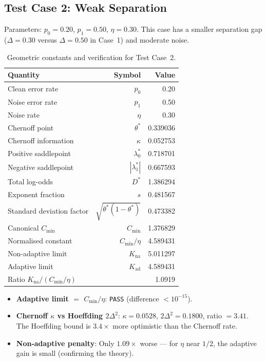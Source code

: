 \documentclass[article]{amsart}
\theoremstyle{definition}
\begin{document}
\subsection{Test Case 2: Weak Separation}

Parameters: $p_0 = 0.20$, $p_1 = 0.50$, $\eta = 0.30$. This case has a smaller separation gap ($\Delta = 0.30$ versus $\Delta = 0.50$ in Case~1) and moderate noise.

\begin{table}[htbp]
\centering
\caption{Geometric constants and verification for Test Case~2.}
\label{tab:case2}
\begin{tabular}{lrr}
\toprule
Quantity & Symbol & Value \\
\midrule
Clean error rate & $p_0$ & 0.20 \\
Noise error rate & $p_1$ & 0.50 \\
Noise rate & $\eta$ & 0.30 \\
Chernoff point & $\theta^*$ & 0.339036 \\
Chernoff information & $\kappa$ & 0.052753 \\
Positive saddlepoint & $\lambda_0^*$ & 0.718701 \\
Negative saddlepoint & $|\lambda_1^*|$ & 0.667593 \\
Total log-odds & $D^*$ & 1.386294 \\
Exponent fraction & $s$ & 0.481567 \\
Standard deviation factor & $\sqrt{\theta^*(1-\theta^*)}$ & 0.473382 \\
\midrule
Canonical $C_{\min}$ & $C_{\min}$ & 1.376829 \\
Normalised constant & $C_{\min}/\eta$ & 4.589431 \\
Non-adaptive limit & $K_{\mathrm{na}}$ & 5.011297 \\
Adaptive limit & $K_{\mathrm{ad}}$ & 4.589431 \\
Ratio $K_{\mathrm{na}} / (C_{\min}/\eta)$ & & 1.0919 \\
\bottomrule
\end{tabular}
\end{table}

\begin{itemize}
    \item\textbf{Adaptive limit $=$ $C_{\min}/\eta$}: \texttt{PASS} (difference $< 10^{-15}$).
    \item\textbf{Chernoff $\kappa$ vs Hoeffding $2\Delta^2$}: $\kappa = 0.0528$, $2\Delta^2 = 0.1800$, ratio $= 3.41$. The Hoeffding bound is $3.4\times$ more optimistic than the Chernoff rate.
    \item\textbf{Non-adaptive penalty}: Only $1.09\times$ worse --- for $\eta$ near $1/2$, the adaptive gain is small (confirming the theory).
\end{itemize}
\end{document}
